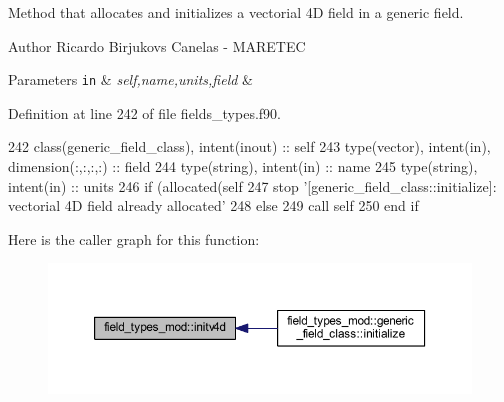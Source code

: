 Method that allocates and initializes a vectorial 4D field in a generic field. 

\begin{DoxyAuthor}{Author}
Ricardo Birjukovs Canelas -\/ M\+A\+R\+E\+T\+EC 
\end{DoxyAuthor}

\begin{DoxyParams}[1]{Parameters}
\mbox{\tt in}  & {\em self,name,units,field} & \\
\hline
\end{DoxyParams}


Definition at line 242 of file fields\+\_\+types.\+f90.


\begin{DoxyCode}
242     \textcolor{keywordtype}{class}(generic\_field\_class), \textcolor{keywordtype}{intent(inout)} :: self
243     \textcolor{keywordtype}{type}(vector), \textcolor{keywordtype}{intent(in)}, \textcolor{keywordtype}{dimension(:,:,:,:)} :: field
244     \textcolor{keywordtype}{type}(string), \textcolor{keywordtype}{intent(in)} :: name
245     \textcolor{keywordtype}{type}(string), \textcolor{keywordtype}{intent(in)} :: units
246     \textcolor{keywordflow}{if} (\textcolor{keyword}{allocated}(self%
247         stop \textcolor{stringliteral}{'[generic\_field\_class::initialize]: vectorial 4D field already allocated'}
248     \textcolor{keywordflow}{else}
249         \textcolor{keyword}{call }self%
250 \textcolor{keywordflow}{    end if}
\end{DoxyCode}
Here is the caller graph for this function\+:\nopagebreak
\begin{figure}[H]
\begin{center}
\leavevmode
\includegraphics[width=350pt]{namespacefield__types__mod_a6a387f83b9c3e63a795e3bccfff5573b_icgraph}
\end{center}
\end{figure}
\mbox{\label{namespacefield__types__mod_a31c78f82114b5bf8014f7aac09030c32}} 
